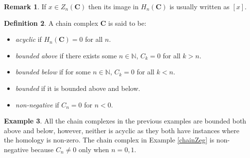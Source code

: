\documentclass[11.5pt, twoside, a4paper, titlepage]{report}
\theoremstyle{definition}
\newtheorem{mydef}{Definition}[section]
\newtheorem{rem}[mydef]{Remark}
\newtheorem{eg}[mydef]{Example}
\theoremstyle{plain}
\begin{document}
\begin{rem} %
If $x\in Z_n(\mathbf{C})$ then its image in $H_n(\mathbf{C})$ is usually written as $[x]$.
\end{rem}

\begin{mydef}
A chain complex $\mathbf{C}$ is said to be:
\begin{itemize}
\item \emph{acyclic} if $H_n(\mathbf{C})=0$ for all $n$.
\item \emph{bounded above} if there exists some $n\in \mathbb{N}$, $C_k=0$ for all $k>n$.
\item \emph{bounded below} if for some $n \in \mathbb{N}$, $C_k=0$ for all $k<n$.
\item \emph{bounded} if it is bounded above and below.
\item \emph{non-negative}  if $C_n=0$ for $n<0$.
\end{itemize}
\end{mydef}

\begin{eg}
All the chain complexes in the previous examples are bounded both above and below, however, neither is acyclic as they both have instances where the homology is non-zero. The chain complex in Example \ref{chainZeg} is non-negative because $C_n\neq 0$ only when $n=0,1$.
\end{eg}
\end{document}
